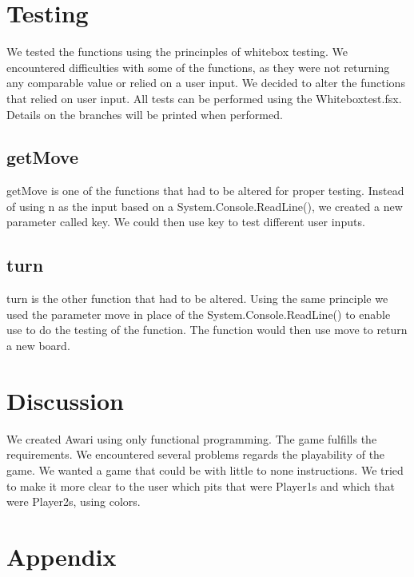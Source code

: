 \documentclass[a4paper]{report}
\begin{document}
\section*{Testing}
We tested the functions using the princinples of whitebox testing. We encountered difficulties with some of the functions, as they were not returning any comparable value or relied on a user input.
We decided to alter the functions that relied on user input. All tests can be performed using the Whiteboxtest.fsx. Details on the branches will be printed when performed.

\subsection*{getMove}
getMove is one of the functions that had to be altered for proper testing. Instead of using n as the input based on a System.Console.ReadLine(), we created a new parameter called key.
We could then use key to test different user inputs.


\subsection*{turn}
turn is the other function that had to be altered. Using the same principle we used the parameter move in place of the System.Console.ReadLine() to enable use to do the testing of the function. The function would then use move
to return a new board.


\section*{Discussion}
We created Awari using only functional programming. The game fulfills the requirements. We encountered several problems regards the playability of the game. We wanted a game that could be with little to none
instructions. We tried to make it more clear to the user which pits that were Player1s and which that were Player2s, using colors.
\section*{Appendix}
\lstset{language=FSharp}

\end{document}
